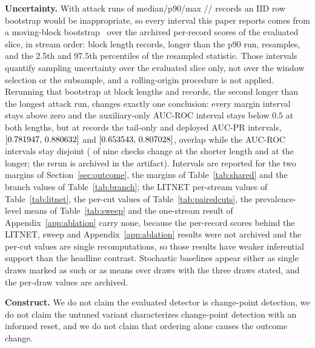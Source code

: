 \documentclass[manuscript,anonymous,review]{acmart}
\begin{document}
\textbf{Uncertainty.} With attack runs of median/p90/max
\StreamCicidsTwoZeroOneSevenRunMedian/\StreamCicidsTwoZeroOneSevenRunPninety/\StreamCicidsTwoZeroOneSevenRunMax{}
records an IID row bootstrap would be inappropriate, so every interval this
paper reports comes from a moving-block bootstrap~\citep{kunsch1989jackknife}
over the archived per-record scores of the evaluated slice, in stream order:
block length
\RefBootBlockLength{} records, longer than the p90 run, \RefBootResamples{}
resamples, and the 2.5th and 97.5th percentiles of the resampled statistic.
Those intervals quantify sampling uncertainty over the evaluated slice only,
not over the window selection or the subsample, and a rolling-origin procedure
is not applied. Rerunning that bootstrap at block lengths
\RefBootRobustBlockLengthA{} and \RefBootRobustBlockLengthB{} records, the
second longer than the longest attack run, changes exactly one conclusion:
every margin interval stays above zero and the auxiliary-only AUC-ROC interval
stays below $0.5$ at both lengths, but at \RefBootRobustBlockLengthB{} records
the tail-only and deployed AUC-PR intervals,
$[0.781947,\,0.880632]$
and
$[0.653543,\,0.807028]$,
overlap while the AUC-ROC intervals stay disjoint
(\RefBootBTwoFiveZeroConclusionChanges{} of nine checks change at the shorter
length and \RefBootBTwoSixZeroZeroConclusionChanges{} at the longer; the rerun
is archived in the artifact). Intervals are reported for the two margins of
Section~\ref{sec:outcome}, the margins of Table~\ref{tab:shared} and the
branch values of Table~\ref{tab:branch}; the LITNET per-stream values of
Table~\ref{tab:litnet}, the per-cut values of Table~\ref{tab:pairedcuts}, the
prevalence-level means of Table~\ref{tab:sweep} and the one-stream result of
Appendix~\ref{app:ablation} carry none, because the per-record scores behind
the LITNET, sweep and Appendix~\ref{app:ablation} results were not archived and
the per-cut values are single recomputations, so those results have weaker
inferential support than the headline contrast.
Stochastic baselines appear either as single draws marked as such or as means
over draws with the three draws stated, and the per-draw values are archived.

\textbf{Construct.} We do not claim the evaluated detector is change-point
detection, we do not claim the untuned variant characterizes change-point
detection with an informed reset, and we do not claim that ordering alone causes the
outcome change.
\end{document}
